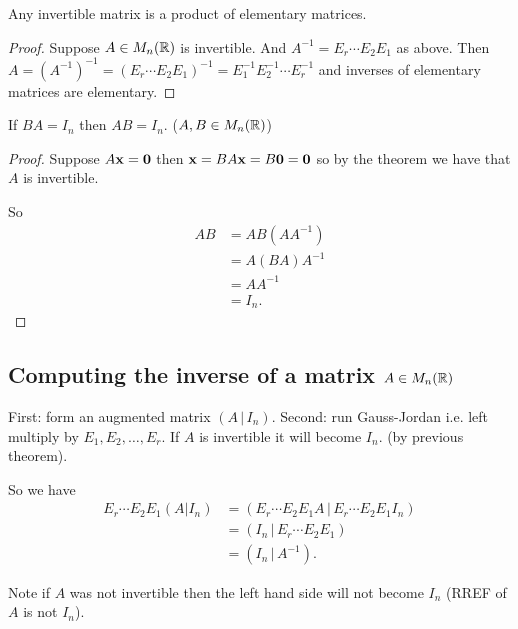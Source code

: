 \documentclass[10pt, a4paper]{article}
\begin{document}
\begin{corollary}
    Any invertible matrix is a product of elementary matrices.
    \begin{proof}
        Suppose $A \in M_n(\mathbb{R})$ is invertible.
        And $A ^ {-1} = E_r \dotsi E_2E_1$ as above.
        Then $A = (A ^ {-1}) ^ {-1} = (E_r\dotsi E_2E_1) ^ {-1} = E_1^{-1}E_2^{-1}\dotsi E_r^{-1}$
        and inverses of elementary matrices are elementary.
    \end{proof}
\end{corollary}

\begin{corollary}
    If $BA = I_n$ then $AB = I_n$. ($A, B \in M_n(\mathbb{R})$)
    \begin{proof}
        Suppose $A\mathbf{x} = \mathbf{0}$ then $\mathbf{x} = BA\mathbf{x} = B\mathbf{0} = \mathbf{0}$ so by the theorem we have that $A$ is invertible.

        So
        \begin{align*}
            AB &= AB(AA ^ {-1}) \\
            &= A(BA)A ^ {-1} \\
            &= AA ^ {-1} \\
            &= I_n.
        \end{align*}
    \end{proof}
\end{corollary}

\subsection{Computing the inverse of a matrix \texorpdfstring{$A \in M_n(\mathbb{R})$}{}}
First:
form an augmented matrix $(A\,|\,I_n)$.
Second: run Gauss-Jordan i.e. left multiply by $E_1, E_2, \dotsc, E_r$.
If $A$ is invertible it will become $I_n$. (by previous theorem).

So we have
\begin{align*}
    E_r \dotsi E_2 E_1 (A | I_n) &= (E_r\dotsi E_2E_1A\,|\,E_r\dotsi E_2E_1I_n) \\
    &= (I_n\,|\,E_r\dotsi E_2E_1) \\
    &= (I_n\,|\,A ^ {-1}).
\end{align*}

Note if $A$ was not invertible then the left hand side will not become $I_n$ (RREF of $A$ is not $I_n$).
\end{document}
